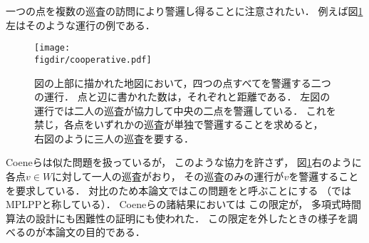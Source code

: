 一つの点を複数の巡査の訪問により警邏し得ることに注意されたい．
例えば図\ref{figure: cooperative}左はそのような運行の例である．
\begin{figure}
  \centering
  \texttt{[image: \\figdir/cooperative.pdf]}
  \caption{図の上部に描かれた地図において，四つの点すべてを警邏する二つの運行．
    点と辺に書かれた数は，それぞれ{\maxIdletime}と距離である．
    左図の運行では二人の巡査が協力して中央の二点を警邏している．
    これを禁じ，各点をいずれかの巡査が単独で警邏することを求めると，
    右図のように三人の巡査を要する．}
  \label{figure: cooperative}
\end{figure}
Coeneら\cite{coene2011charlemagne}は似た問題を扱っているが，
このような協力を許さず，
図\ref{figure: cooperative}右のように
各点$v \in W$に対して一人の巡査がおり，
その巡査のみの運行が$v$を警邏することを要求している．
対比のため本論文ではこの問題をと呼ぶことにする
（\cite{coene2011charlemagne}ではMPLPPと称している）．
Coeneら\cite{coene2011charlemagne}の諸結果においては
この限定が，
多項式時間算法の設計にも困難性の証明にも使われた．
この限定を外したときの様子を調べるのが本論文の目的である．

